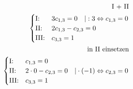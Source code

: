 \begin{align*}
    \text{I + II}                                                                                              \\
    \begin{cases}
        \text{I:\@}   & 3c_{1,3}  = 0 \quad | : 3 \Leftrightarrow c_{1,3} = 0 \\
        \text{II:\@}  & 2c_{1,3} - c_{2,3} = 0                                \\
        \text{III:\@} & c_{3,3} = 1
    \end{cases}                                      \\
    \text{in II einsetzen}                                                                                     \\
    \begin{cases}
        \text{I:\@}   & c_{1,3} = 0                                                              \\
        \text{II:\@}  & 2 \cdot 0 - c_{2, 3} = 0 \quad | \cdot (-1) \Leftrightarrow c_{2, 3} = 0 \\
        \text{III:\@} & c_{3,3} = 1
    \end{cases}                   \\
\end{align*}

